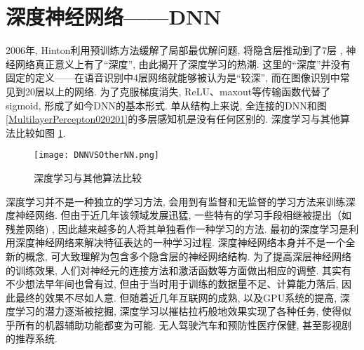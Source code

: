 \section{深度神经网络——DNN}
2006年, Hinton利用预训练方法缓解了局部最优解问题, 将隐含层推动到了7层 \cite{Hinton2006-9587}, 神经网络真正意义上有了“深度”, 由此揭开了深度学习的热潮. 
这里的“深度”并没有固定的定义——在语音识别中4层网络就能够被认为是“较深”, 而在图像识别中常见到20层以上的网络. 
为了克服梯度消失, ReLU、maxout等传输函数代替了sigmoid, 形成了如今DNN的基本形式. 单从结构上来说, 全连接的DNN和图 \ref{MultilayerPercepton020201}的多层感知机是没有任何区别的. 
深度学习与其他算法比较如图 \ref{DNNVSOtherNN}.
\begin{figure}[htbp]
\vspace{-0.4cm}
    \centering
    \texttt{[image: DNNVSOtherNN.png]}
    \caption{深度学习与其他算法比较}
    \label{DNNVSOtherNN}
\end{figure}
深度学习并不是一种独立的学习方法, 会用到有监督和无监督的学习方法来训练深度神经网络.
但由于近几年该领域发展迅猛, 一些特有的学习手段相继被提出（如残差网络) , 因此越来越多的人将其单独看作一种学习的方法.
最初的深度学习是利用深度神经网络来解决特征表达的一种学习过程.
深度神经网络本身并不是一个全新的概念, 可大致理解为包含多个隐含层的神经网络结构. 为了提高深层神经网络的训练效果, 人们对神经元的连接方法和激活函数等方面做出相应的调整.
其实有不少想法早年间也曾有过, 但由于当时用于训练的数据量不足、计算能力落后, 因此最终的效果不尽如人意.
但随着近几年互联网的成熟, 以及GPU系统的提高, 深度学习的潜力逐渐被挖掘, 深度学习以摧枯拉朽般地效果实现了各种任务, 使得似乎所有的机器辅助功能都变为可能.
无人驾驶汽车和预防性医疗保健, 甚至影视剧的推荐系统.

